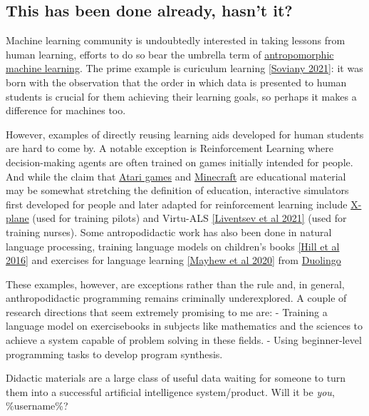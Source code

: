 \subsection{This has been done already, hasn't it?}\label{this-has-been-done-already-hasnt-it}

Machine learning community is undoubtedly interested in taking lessons
from human learning, efforts to do so bear the umbrella term of
\href{https://ieeexplore.ieee.org/document/8481253}{antropomorphic
machine learning}. The prime example is curiculum learning
\href{https://arxiv.org/abs/2101.10382}{{[}Soviany 2021{]}}: it was born
with the observation that the order in which data is presented to human
students is crucial for them achieving their learning goals, so perhaps
it makes a difference for machines too.

However, examples of directly reusing learning aids developed for human
students are hard to come by. A notable exception is Reinforcement
Learning where decision-making agents are often trained on games
initially intended for people. And while the claim that
\href{https://gym.openai.com/envs/\#atari}{Atari games} and
\href{https://www.microsoft.com/en-us/research/project/project-malmo/}{Minecraft}
are educational material may be somewhat stretching the definition of
education, interactive simulators first developed for people and later
adapted for reinforcement learning include
\href{https://openreview.net/pdf?id=H1mMHwt9X}{X-plane} (used for
training pilots) and Virtu-ALS
\href{https://pubmed.ncbi.nlm.nih.gov/34977561/}{{[}Liventsev et al
2021{]}} (used for training nurses). Some antropodidactic work has also
been done in natural language processing, training language models on
children's books \href{https://arxiv.org/pdf/1511.02301.pdf}{{[}Hill et
al 2016{]}} and exercises for language learning
\href{https://aclanthology.org/2020.ngt-1.28.pdf}{{[}Mayhew et al
2020{]}} from \href{https://www.duolingo.com/}{Duolingo}

These examples, however, are exceptions rather than the rule and, in
general, anthropodidactic programming remains criminally underexplored.
A couple of research directions that seem extremely promising to me are:
- Training a language model on exercisebooks in subjects like
mathematics and the sciences to achieve a system capable of problem
solving in these fields. - Using beginner-level programming tasks to
develop program synthesis.

Didactic materials are a large class of useful data waiting for someone
to turn them into a successful artificial intelligence system/product.
Will it be \emph{you}, \%username\%?